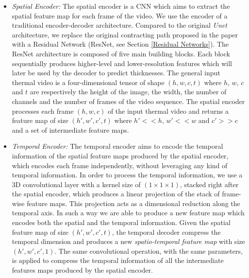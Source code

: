 \begin{itemize}
    \item \textit{Spatial Encoder:} The spatial encoder is a CNN which aims to extract the spatial feature map for each frame of the video. 
    We use the encoder of a traditional encoder-decoder architecture. Compared to the original \textit{Unet} architecture, we replace the original contracting path proposed in the paper with a Residual Network (ResNet, see Section \ref{Residual Networks}). The ResNet architecture is composed of five main building blocks. Each block sequentially produces higher-level and lower-resolution features which will later be used by the decoder to predict thicknesses. The general input thermal video is a four-dimensional tensor of shape $(h, w, c, t)$ where $h$, $w$, $c$ and $t$ are respectively the height of the image, the width, the number of channels and the number of frames of the video sequence. The spatial encoder processes each frame $(h, w, c)$ of the input thermal video and returns a feature map of size $(h', w', c', t)$ where $h'<<h$, $w'<<w$ and $c'>>c$ and a set of intermediate feature maps.
    

    \item \textit{Temporal Encoder:} The temporal encoder aims to encode the temporal information of the spatial feature maps produced by the spatial encoder, which encodes each frame independently, without leveraging any kind of temporal information. In order to process the temporal information, we use a 3D convolutional layer with a kernel size of $(1\times1\times1)$, stacked right after the spatial encoder, which produces a linear projection of the stack of frame-wise feature maps. This projection acts as a dimensional reduction along the temporal axis. In such a way we are able to produce a new feature map which encodes both the spatial and the temporal information. Given the spatial feature map of size $(h', w', c', t)$, the temporal decoder compress the temporal dimension and produces a new \textit{spatio-temporal feature map} with size $(h', w', c', 1)$.  The same convolutional operation, with the same parameters, is applied to compress the temporal information of all the intermediate features maps produced by the spatial encoder.
    

\end{itemize}
